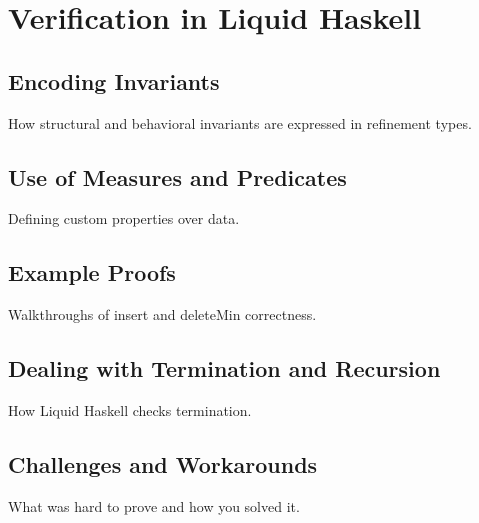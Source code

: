 \chapter { Verification in Liquid Haskell }
\section { Encoding Invariants }
How structural and behavioral invariants are expressed in refinement types.

\section { Use of Measures and Predicates }
Defining custom properties over data.

\section { Example Proofs }
Walkthroughs of insert and deleteMin correctness.

\section { Dealing with Termination and Recursion }
How Liquid Haskell checks termination.

\section { Challenges and Workarounds }
What was hard to prove and how you solved it.

